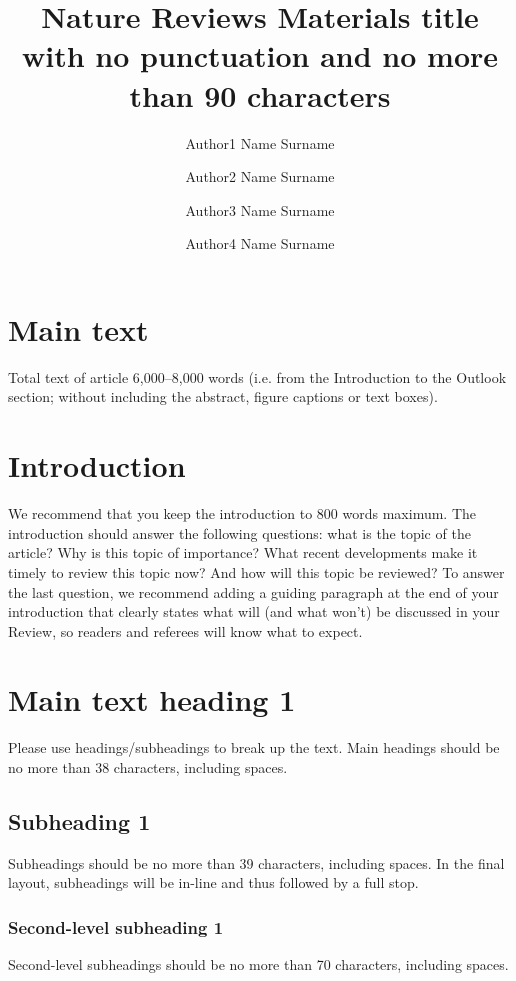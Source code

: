 \documentclass[fleqn,10pt]{wlscirep}
\title{Nature Reviews Materials title with no punctuation and no more than 90 characters}
\author[1,*]{Author1 Name Surname}
\author[2]{Author2 Name Surname}
\author[1,2]{Author3 Name Surname}
\author[2]{Author4 Name Surname}
\affil[1]{Affiliation, Department, City, Country}
\affil[2]{Affiliation, Department, City, Country}
\affil[*]{e-mail: name.surname@email.edu}
\begin{document}
\flushbottom
\maketitle

\thispagestyle{empty}

\section*{Main text}

Total text of article 6,000–8,000 words (i.e. from the Introduction to the Outlook section; without including the abstract, figure captions or text boxes).



\section*{Introduction}

We recommend that you keep the introduction to 800 words maximum. The introduction should answer the following questions: what is the topic of the article? Why is this topic of importance? What recent developments make it timely to review this topic now? And how will this topic be reviewed? To answer the last question, we recommend adding a guiding paragraph at the end of your introduction that clearly states what will (and what won’t) be discussed in your Review, so readers and referees will know what to expect.


\section*{Main text heading 1}

Please use headings/subheadings to break up the text. Main headings should be no more than 38 characters, including spaces.

\subsection*{Subheading 1}

Subheadings should be no more than 39 characters, including spaces. In the final layout, subheadings will be in-line and thus followed by a full stop.

\subsubsection*{Second-level subheading 1}
Second-level subheadings should be no more than 70 characters, including spaces.
\end{document}
